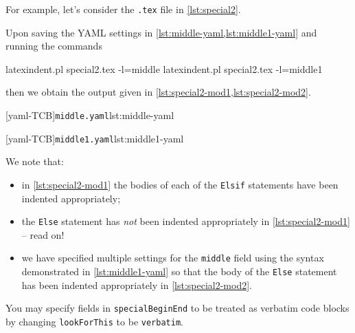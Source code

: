 \begin{example}
 For example, let's consider the \texttt{.tex} file in \cref{lst:special2}.


 Upon saving the YAML settings in \cref{lst:middle-yaml,lst:middle1-yaml} and running the
 commands 

 \begin{commandshell}
latexindent.pl special2.tex -l=middle
latexindent.pl special2.tex -l=middle1
\end{commandshell}

 then we obtain the output given in \cref{lst:special2-mod1,lst:special2-mod2}.

 \begin{cmhtcbraster}
  [yaml-TCB]{\texttt{middle.yaml}}{lst:middle-yaml}
 \end{cmhtcbraster}

 \begin{cmhtcbraster}
  [yaml-TCB]{\texttt{middle1.yaml}}{lst:middle1-yaml}
 \end{cmhtcbraster}

 We note that:
 \begin{itemize}
  \item in \cref{lst:special2-mod1} the bodies of each of the \texttt{Elsif} statements have been
        indented appropriately;
  \item the \texttt{Else} statement has \emph{not} been indented appropriately in
        \cref{lst:special2-mod1} -- read on!
  \item we have specified multiple settings for the \texttt{middle} field using the syntax
        demonstrated in \cref{lst:middle1-yaml} so that the body of the \texttt{Else} statement
        has been indented appropriately in \cref{lst:special2-mod2}.
 \end{itemize}
 \end{example}

 You may  specify fields in
 \texttt{specialBeginEnd} to be treated as verbatim code blocks by changing
 \texttt{lookForThis} to be \texttt{verbatim}. %

